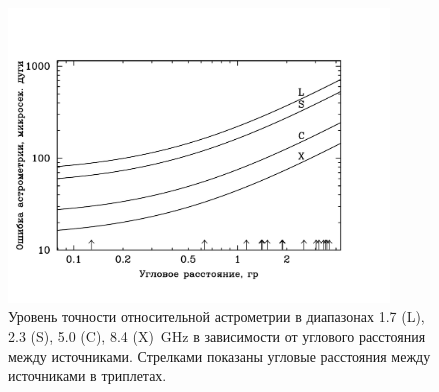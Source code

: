 \begin{figure}
 \includegraphics[width=0.9\textwidth]{rel_astrometry_errors.pdf}
 \caption{Уровень точности относительной астрометрии в диапазонах
          1.7 (L), 2.3 (S), 5.0 (C), 8.4 (X)~\si{\GHz} в зависимости от
          углового расстояния между источниками. Стрелками показаны
          угловые расстояния между источниками в триплетах.}
 \label{fig:astro_err}
\end{figure}

